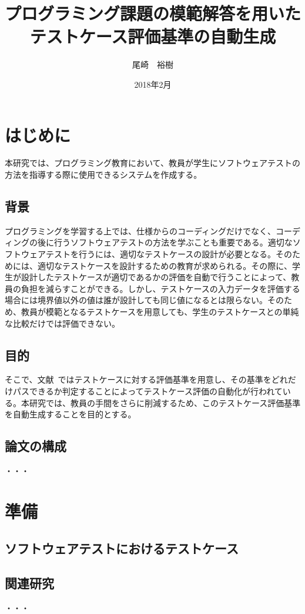 \documentclass{tpu-sotu}
\author{尾崎　裕樹}
\title{プログラミング課題の模範解答を用いた\\テストケース評価基準の自動生成}
\date{2018年2月}
\begin{document}
%
\maketitle
\clearpage
{}
\tableofcontents
\clearpage
{}
%

%
\chapter{はじめに}
本研究では、プログラミング教育において、教員が学生にソフトウェアテストの方法を指導する際に使用できるシステムを作成する。
\section{背景}
プログラミングを学習する上では、仕様からのコーディングだけでなく、コーディングの後に行うソフトウェアテストの方法を学ぶことも重要である。適切なソフトウェアテストを行うには、適切なテストケースの設計が必要となる。そのためには、適切なテストケースを設計するための教育が求められる。その際に、学生が設計したテストケースが適切であるかの評価を自動で行うことによって、教員の負担を減らすことができる。しかし、テストケースの入力データを評価する場合には境界値以外の値は誰が設計しても同じ値になるとは限らない。そのため、教員が模範となるテストケースを用意しても、学生のテストケースとの単純な比較だけでは評価できない。
\section{目的}
そこで、文献~\cite{a1}ではテストケースに対する評価基準を用意し、その基準をどれだけパスできるか判定することによってテストケース評価の自動化が行われている。本研究では、教員の手間をさらに削減するため、このテストケース評価基準を自動生成することを目的とする。
\section{論文の構成}
  ・・・
\chapter{準備}
\section{ソフトウェアテストにおけるテストケース}
\section{関連研究}
  ・・・
\end{document}
